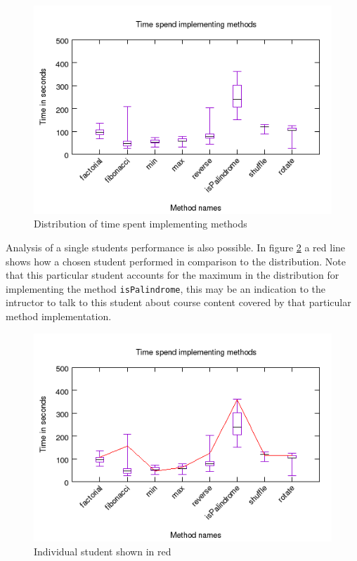 \documentclass[twocolumn]{article}
\begin{document}
\begin{figure}[h!bt]
\includegraphics[width=\linewidth]{figures/method_time}
\caption{Distribution of time spent implementing methods}
\label{fig:method_time}
\end{figure}

Analysis of a single students performance is also possible. In figure
\ref{fig:student1} a red line shows how a chosen student performed in
comparison to the distribution. Note that this particular student accounts for
the maximum in the distribution for implementing the method
\texttt{isPalindrome}, this may be an indication to the intructor to talk to
this student about course content covered by that particular method
implementation.

\begin{figure}[h!bt]
\includegraphics[width=\linewidth]{figures/student1}
\caption{Individual student shown in red}
\label{fig:student1}
\end{figure}
\end{document}
